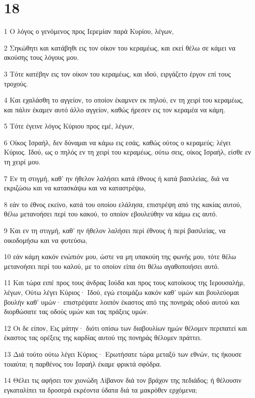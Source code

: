 \chapter{18}

\par 1 Ο λόγος ο γενόμενος προς Ιερεμίαν παρά Κυρίου, λέγων,
\par 2 Σηκώθητι και κατάβηθι εις τον οίκον του κεραμέως, και εκεί θέλω σε κάμει να ακούσης τους λόγους μου.
\par 3 Τότε κατέβην εις τον οίκον του κεραμέως, και ιδού, ειργάζετο έργον επί τους τροχούς.
\par 4 Και εχαλάσθη το αγγείον, το οποίον έκαμνεν εκ πηλού, εν τη χειρί του κεραμέως, και πάλιν έκαμεν αυτό άλλο αγγείον, καθώς ήρεσεν εις τον κεραμέα να κάμη.
\par 5 Τότε έγεινε λόγος Κύριου προς εμέ, λέγων,
\par 6 Οίκος Ισραήλ, δεν δύναμαι να κάμω εις εσάς, καθώς ούτος ο κεραμεύς; λέγει Κύριος. Ιδού, ως ο πηλός εν τη χειρί του κεραμέως, ούτω σεις, οίκος Ισραήλ, είσθε εν τη χειρί μου.
\par 7 Εν τη στιγμή, καθ' ην ήθελον λαλήσει κατά έθνους ή κατά βασιλείας, διά να εκριζώσω και να κατασκάψω και να καταστρέψω,
\par 8 εάν το έθνος εκείνο, κατά του οποίου ελάλησα, επιστρέψη από της κακίας αυτού, θέλω μετανοήσει περί του κακού, το οποίον εβουλεύθην να κάμω εις αυτό.
\par 9 Και εν τη στιγμή, καθ' ην ήθελον λαλήσει περί έθνους ή περί βασιλείας, να οικοδομήσω και να φυτεύσω,
\par 10 εάν κάμη κακόν ενώπιόν μου, ώστε να μη υπακούη της φωνής μου, τότε θέλω μετανοήσει περί του καλού, με το οποίον είπα ότι θέλω αγαθοποιήσει αυτό.
\par 11 Και τώρα ειπέ προς τους άνδρας Ιούδα και προς τους κατοίκους της Ιερουσαλήμ, λέγων, Ούτω λέγει Κύριος· Ιδού, εγώ ετοιμάζω κακόν καθ' υμών και βουλεύομαι βουλήν καθ' υμών· επιστρέψατε λοιπόν έκαστος από της πονηράς οδού αυτού και διορθώσατε τας οδούς υμών και τας πράξεις υμών.
\par 12 Οι δε είπον, Εις μάτην· διότι οπίσω των διαβουλίων ημών θέλομεν περιπατεί και έκαστος τας ορέξεις της καρδίας αυτού της πονηράς θέλομεν πράττει.
\par 13 Διά τούτο ούτω λέγει Κύριος· Ερωτήσατε τώρα μεταξύ των εθνών, τις ήκουσε τοιαύτα; η παρθένος του Ισραήλ έκαμε φρικτά σφόδρα.
\par 14 Θέλει τις αφήσει τον χιονώδη Λίβανον διά τον βράχον της πεδιάδος; ή θέλουσιν εγκαταλίπει τα δροσερά εκρέοντα ύδατα διά τα μακρόθεν ερχόμενα;
